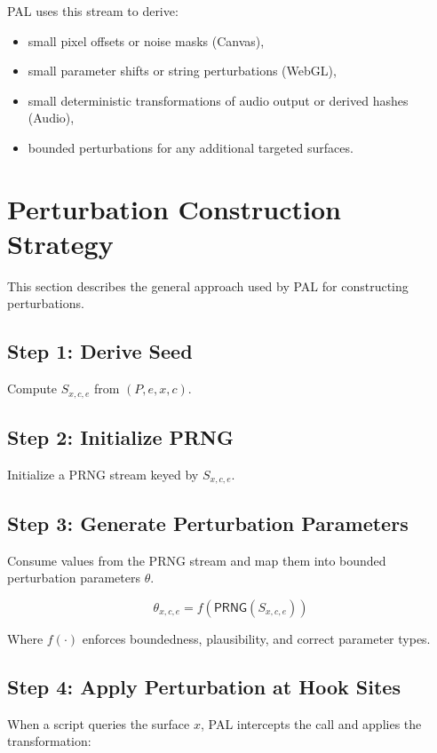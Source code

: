 \documentclass[11pt]{report}
\begin{document}
PAL uses this stream to derive:
\begin{itemize}
    \item small pixel offsets or noise masks (Canvas),
    \item small parameter shifts or string perturbations (WebGL),
    \item small deterministic transformations of audio output or derived hashes (Audio),
    \item bounded perturbations for any additional targeted surfaces.
\end{itemize}

\section{Perturbation Construction Strategy}

This section describes the general approach used by PAL for constructing perturbations.

\subsection{Step 1: Derive Seed}

Compute $S_{x,c,e}$ from $(P,e,x,c)$.

\subsection{Step 2: Initialize PRNG}

Initialize a PRNG stream keyed by $S_{x,c,e}$.

\subsection{Step 3: Generate Perturbation Parameters}

Consume values from the PRNG stream and map them into bounded perturbation parameters $\theta$.

\[
\theta_{x,c,e} = f\left(\mathsf{PRNG}(S_{x,c,e})\right)
\]

Where $f(\cdot)$ enforces boundedness, plausibility, and correct parameter types.

\subsection{Step 4: Apply Perturbation at Hook Sites}

When a script queries the surface $x$, PAL intercepts the call and applies the transformation:
\end{document}
